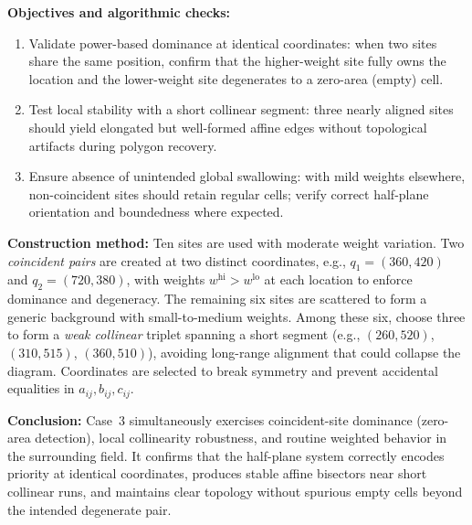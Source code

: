 \documentclass{article}
\begin{document}

\textbf{Objectives and algorithmic checks:}
\begin{enumerate}
    \item Validate power-based dominance at identical coordinates: when two sites share the same position, confirm that the higher-weight site fully owns the location and the lower-weight site degenerates to a zero-area (empty) cell.
    \item Test local stability with a short collinear segment: three nearly aligned sites should yield elongated but well-formed affine edges without topological artifacts during polygon recovery.
    \item Ensure absence of unintended global swallowing: with mild weights elsewhere, non-coincident sites should retain regular cells; verify correct half-plane orientation and boundedness where expected.
\end{enumerate}

\textbf{Construction method:}
Ten sites are used with moderate weight variation. Two \emph{coincident pairs} are created at two distinct coordinates, e.g., $q_1=(360,420)$ and $q_2=(720,380)$, with weights $w^\text{hi}>w^\text{lo}$ at each location to enforce dominance and degeneracy. The remaining six sites are scattered to form a generic background with small-to-medium weights. Among these six, choose three to form a \emph{weak collinear} triplet spanning a short segment (e.g., $(260,520)$, $(310,515)$, $(360,510)$), avoiding long-range alignment that could collapse the diagram. Coordinates are selected to break symmetry and prevent accidental equalities in $a_{ij},b_{ij},c_{ij}$.

\textbf{Conclusion:}
Case~3 simultaneously exercises coincident-site dominance (zero-area detection), local collinearity robustness, and routine weighted behavior in the surrounding field. It confirms that the half-plane system correctly encodes priority at identical coordinates, produces stable affine bisectors near short collinear runs, and maintains clear topology without spurious empty cells beyond the intended degenerate pair.

\end{document}
